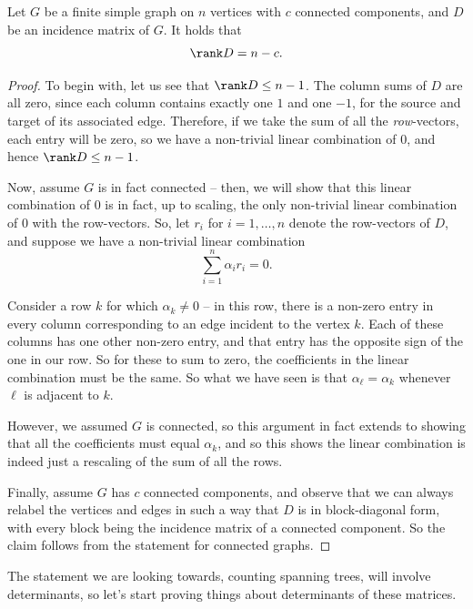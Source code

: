 \documentclass[nobib]{tufte-handout}
\begin{document}
\begin{lemma}\label{lemma:ranks_of_incidence_matrix}
    Let $G$ be a finite simple graph on $n$ vertices with $c$ connected components, and $D$ be an incidence matrix of $G$. It holds that
    $$\rank D = n - c.$$

    \begin{proof}
        To begin with, let us see that $\rank D \leq n - 1$. The column sums of $D$ are all zero, since each column contains exactly one $1$ and one $-1$, for the source and target of its associated edge. Therefore, if we take the sum of all the \emph{row}-vectors, each entry will be zero, so we have a non-trivial linear combination of $0$, and hence $\rank D \leq n - 1$.

        Now, assume $G$ is in fact connected -- then, we will show that this linear combination of $0$ is in fact, up to scaling, the only non-trivial linear combination of $0$ with the row-vectors. So, let $r_i$ for $i = 1,\ldots,n$ denote the row-vectors of $D$, and suppose we have a non-trivial linear combination
        $$\sum_{i=1}^n \alpha_i r_i = 0.$$

        Consider a row $k$ for which $\alpha_k \neq 0$ -- in this row, there is a non-zero entry in every column corresponding to an edge incident to the vertex $k$. Each of these columns has one other non-zero entry, and that entry has the opposite sign of the one in our row. So for these to sum to zero, the coefficients in the linear combination must be the same. So what we have seen is that $\alpha_\ell = \alpha_k$ whenever $\ell$ is adjacent to $k$.

        However, we assumed $G$ is connected, so this argument in fact extends to showing that all the coefficients must equal $\alpha_k$, and so this shows the linear combination is indeed just a rescaling of the sum of all the rows.

        Finally, assume $G$ has $c$ connected components, and observe that we can always relabel the vertices and edges in such a way that $D$ is in block-diagonal form, with every block being the incidence matrix of a connected component. So the claim follows from the statement for connected graphs.
    \end{proof}
\end{lemma}

The statement we are looking towards, counting spanning trees, will involve determinants, so let's start proving things about determinants of these matrices.
\end{document}
